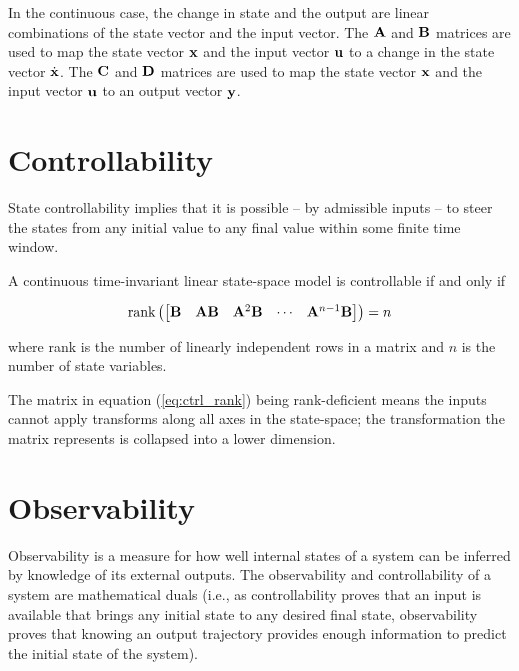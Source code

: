 In the continuous case, the change in state and the output are linear
combinations of the state vector and the input vector. The $\mathbf{A}$ and
$\mathbf{B}$ matrices are used to map the state vector $\mathbf{x}$ and the input
vector $\mathbf{u}$ to a change in the state vector $\dot{\mathbf{x}}$. The $\mathbf{C}$
and $\mathbf{D}$ matrices are used to map the state vector $\mathbf{x}$ and the input
vector $\mathbf{u}$ to an output vector $\mathbf{y}$.

\section{Controllability}

State controllability implies that it is possible -- by admissible inputs -- to
steer the \glspl{state} from any initial value to any final value within some
finite time window.

\begin{theorem}[Controllability]
  A continuous \gls{time-invariant} linear state-space \gls{model} is
  controllable if and only if

  \begin{equation}
    \text{rank} \left(
    \begin{bmatrix}
      \mathbf{B} & \mathbf{A}\mathbf{B} & \mathbf{A}^2\mathbf{B} & \cdots &
      \mathbf{A}^{n-1}\mathbf{B}
    \end{bmatrix}
    \right) = n
    \label{eq:ctrl_rank}
  \end{equation}

  where rank is the number of linearly independent rows in a matrix and $n$ is
  the number of \gls{state} variables.
\end{theorem}

The matrix in equation (\ref{eq:ctrl_rank}) being rank-deficient means the
inputs cannot apply transforms along all axes in the state-space; the
transformation the matrix represents is collapsed into a lower dimension.

\section{Observability}

Observability is a measure for how well internal \glspl{state} of a \gls{system}
can be inferred by knowledge of its external outputs. The observability and
controllability of a \gls{system} are mathematical duals (i.e., as
controllability proves that an input is available that brings any initial
\gls{state} to any desired final \gls{state}, observability proves that knowing
an output trajectory provides enough information to predict the initial
\gls{state} of the \gls{system}).

